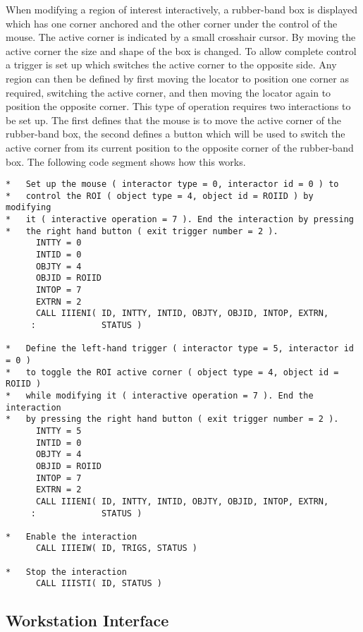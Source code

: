 When modifying a region of interest interactively, a rubber-band box
is displayed which has one corner anchored and the other corner under
the control of the mouse. The active corner is indicated by a small
crosshair cursor. By moving the active corner the size and shape of the
box is changed. To allow complete control a trigger is set up which
switches the active corner to the opposite side. Any region can then be
defined by first moving the locator to position one corner as required,
switching the active corner, and then moving the locator again to position
the opposite corner. This type of operation requires two interactions to be
set up. The first defines that the mouse is to move the active
corner of the rubber-band box, the second defines a button which will
be used to switch the active corner from its current position to the
opposite corner of the rubber-band box.
The following code segment shows how this works.
\begin{small}
\begin{verbatim}
*   Set up the mouse ( interactor type = 0, interactor id = 0 ) to
*   control the ROI ( object type = 4, object id = ROIID ) by modifying
*   it ( interactive operation = 7 ). End the interaction by pressing
*   the right hand button ( exit trigger number = 2 ).
      INTTY = 0
      INTID = 0
      OBJTY = 4
      OBJID = ROIID
      INTOP = 7
      EXTRN = 2
      CALL IIIENI( ID, INTTY, INTID, OBJTY, OBJID, INTOP, EXTRN,
     :             STATUS )

*   Define the left-hand trigger ( interactor type = 5, interactor id = 0 )
*   to toggle the ROI active corner ( object type = 4, object id = ROIID )
*   while modifying it ( interactive operation = 7 ). End the interaction
*   by pressing the right hand button ( exit trigger number = 2 ).
      INTTY = 5
      INTID = 0
      OBJTY = 4
      OBJID = ROIID
      INTOP = 7
      EXTRN = 2
      CALL IIIENI( ID, INTTY, INTID, OBJTY, OBJID, INTOP, EXTRN,
     :             STATUS )

*   Enable the interaction
      CALL IIIEIW( ID, TRIGS, STATUS )

*   Stop the interaction
      CALL IIISTI( ID, STATUS )
\end{verbatim}
\end{small}

\subsection{Workstation Interface}

